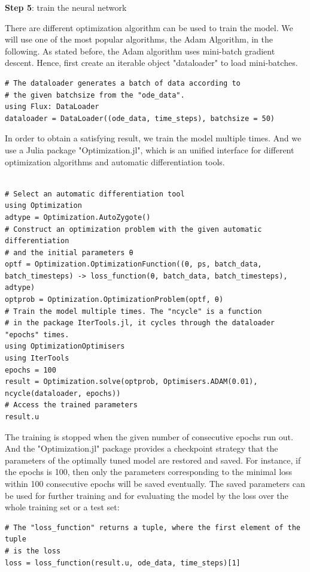 \documentclass[
	parskip, 			   %
	twoside, 			   %
	DIV=14, 			   %
	BCOR=15.0mm, 		   %
	headsepline, 		   %
	open=right, 		   %
	captions=tableheading, %
	bibliography=totoc,    %
	numbers=noenddot       %
]{scrreprt}
\begin{document}
\textbf{Step 5}: train the neural network

There are different optimization algorithm can be used to train the model. We will use one of the most popular algorithms, the Adam Algorithm, in the following. As stated before, the Adam algorithm uses mini-batch gradient descent. Hence, first create an iterable object "dataloader" to load mini-batches.

\begin{verbatim}
# The dataloader generates a batch of data according to 
# the given batchsize from the "ode_data".
using Flux: DataLoader
dataloader = DataLoader((ode_data, time_steps), batchsize = 50)
\end{verbatim}

In order to obtain a satisfying result, we train the model multiple times. And we use a Julia package "Optimization.jl", which is an unified interface for different optimization algorithms and automatic differentiation tools.

\begin{verbatim}

# Select an automatic differentiation tool
using Optimization
adtype = Optimization.AutoZygote()
# Construct an optimization problem with the given automatic differentiation 
# and the initial parameters θ
optf = Optimization.OptimizationFunction((θ, ps, batch_data, batch_timesteps) -> loss_function(θ, batch_data, batch_timesteps), adtype)
optprob = Optimization.OptimizationProblem(optf, θ)
# Train the model multiple times. The "ncycle" is a function 
# in the package IterTools.jl, it cycles through the dataloader "epochs" times.
using OptimizationOptimisers
using IterTools
epochs = 100
result = Optimization.solve(optprob, Optimisers.ADAM(0.01), ncycle(dataloader, epochs))
# Access the trained parameters
result.u
\end{verbatim}

The training is stopped when the given number of consecutive epochs run out. And the "Optimization.jl" package provides a checkpoint strategy that the parameters of the optimally tuned model are restored and saved. For instance, if the epochs is 100, then only the parameters corresponding to the minimal loss within 100 consecutive epochs will be saved eventually.  The saved parameters can be used for further training and for evaluating the model by the loss over the whole training set or a test set:
\begin{verbatim}
# The "loss_function" returns a tuple, where the first element of the tuple 
# is the loss
loss = loss_function(result.u, ode_data, time_steps)[1]
\end{verbatim}
\end{document}
